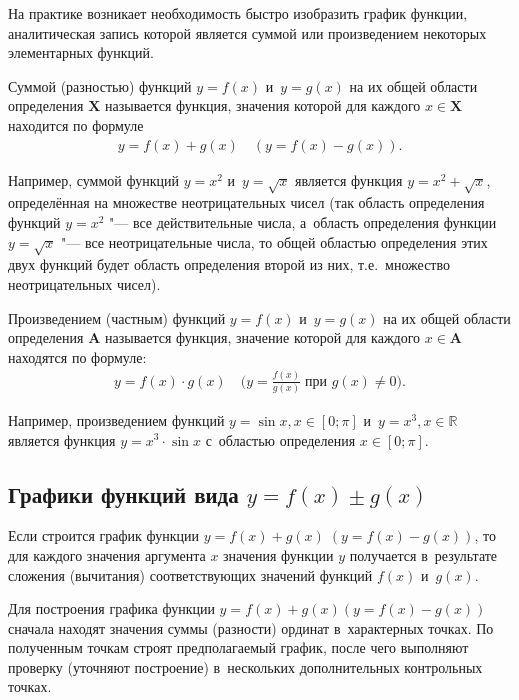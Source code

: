 На практике возникает необходимость быстро изобразить график функции,
аналитическая запись которой является суммой или произведением
некоторых элементарных функций.

\begin{Def}
Суммой (разностью) функций $y = f(x)$ и~$y = g(x)$
на их общей области определения $\mathbf{X}$ называется функция,
значения которой для каждого $x \in \mathbf{X}$ находится по формуле
\begin{gather*}
y = f(x) + g(x) \quad (y = f(x) - g(x)).
\end{gather*}
\end{Def}

Например, суммой функций $y = x^{2}$ и~$y = \sqrt{x}$ является
функция $y = x^{2} + \sqrt{x}$, определённая на множестве
неотрицательных чисел (так область определения функций $y = x^{2}$
"--- все действительные числа, а~область определения функции
$y = \sqrt{x}$ "--- все неотрицательные числа, то общей областью
определения этих двух функций будет область определения второй из них,
т.е.\ множество неотрицательных чисел).

\begin{Def}
Произведением (частным) функций $y = f(x)$ и~$y = g(x)$ на их общей
области определения $\mathbf{A}$ называется функция, значение которой
для каждого $x \in \mathbf{A}$ находятся по формуле:
\begin{gather*}
y = f(x) \cdot g(x) \quad
(\displaystyle y = \frac{f(x)}{g(x)} \;
\text{при $g(x) \ne 0)$}.
\end{gather*}
\end{Def}

Например, произведением функций $y = \sin x, x \in [0; \pi]$
и~$y = x^{3}, x \in \mathbb{R}$ является функция $y = x^{3} \cdot \sin x$
с~областью определения $x \in [0; \pi]$.

\subsection{Графики функций вида $y = f(x) \pm g(x)$}
Если строится график функции $y = f(x) + g(x) \; (y = f(x) - g(x))$,
то для каждого значения аргумента $x$ значения функции $y$ получается
в~результате сложения (вычитания) соответствующих значений функций
$f(x)$ и~$g(x)$.

Для построения графика функции $y = f(x) + g(x) (y = f(x) - g(x))$
сначала находят значения суммы (разности) ординат в~характерных точках.
По полученным точкам строят предполагаемый график, после чего выполняют
проверку (уточняют построение) в~нескольких дополнительных
контрольных точках.

